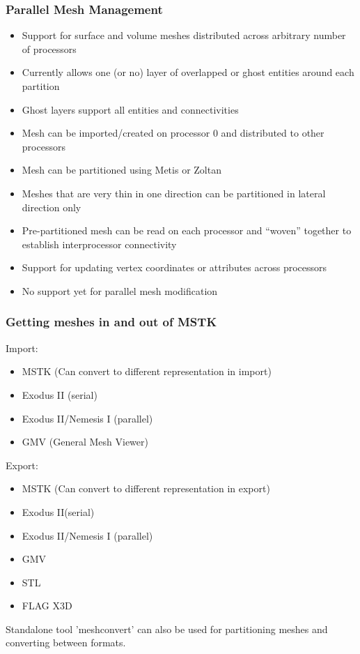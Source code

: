 \documentclass{beamer}
\begin{document}
\begin{frame}
\frametitle{Parallel Mesh Management}

\begin{itemize}
\item Support for surface and volume meshes distributed across arbitrary number of processors
\item Currently allows one (or no) layer of overlapped or ghost entities around each partition
\item Ghost layers support all entities and connectivities
\item Mesh can be imported/created on processor 0 and distributed to other processors
\item Mesh can be partitioned using Metis or Zoltan
\item Meshes that are very thin in one direction can be partitioned in lateral direction only
\item Pre-partitioned mesh can be read on each processor and ``woven'' together to establish interprocessor connectivity
\item Support for updating vertex coordinates or attributes across processors
\item No support yet for parallel mesh modification
\end{itemize}

\end{frame}

\begin{frame}
\frametitle{Getting meshes in and out of MSTK}

Import:
\begin{itemize}
\item MSTK (Can convert to different representation in import)
\item Exodus II (serial)
\item Exodus II/Nemesis I (parallel)
\item GMV (General Mesh Viewer)
\end{itemize}

Export:
\begin{itemize}
\item MSTK (Can convert to different representation in export)
\item Exodus II(serial)
\item Exodus II/Nemesis I (parallel)
\item GMV
\item STL
\item FLAG X3D
\end{itemize}

Standalone tool 'meshconvert' can also be used for partitioning meshes
and converting between formats.
\end{frame}
\end{document}

